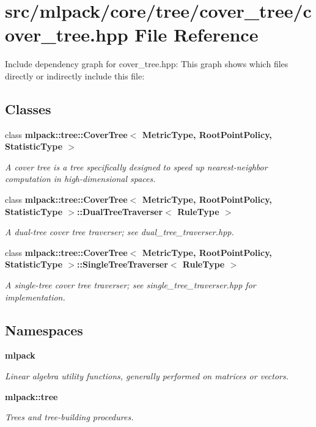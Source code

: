 \section{src/mlpack/core/tree/cover\-\_\-tree/cover\-\_\-tree.hpp File Reference}
\label{cover__tree_2cover__tree_8hpp}
Include dependency graph for cover\-\_\-tree.\-hpp\-:
This graph shows which files directly or indirectly include this file\-:
\subsection*{Classes}
\begin{DoxyCompactItemize}
\item 
class {\bf mlpack\-::tree\-::\-Cover\-Tree$<$ Metric\-Type, Root\-Point\-Policy, Statistic\-Type $>$}
\begin{DoxyCompactList}\small\item\em A cover tree is a tree specifically designed to speed up nearest-\/neighbor computation in high-\/dimensional spaces. \end{DoxyCompactList}\item 
class {\bf mlpack\-::tree\-::\-Cover\-Tree$<$ Metric\-Type, Root\-Point\-Policy, Statistic\-Type $>$\-::\-Dual\-Tree\-Traverser$<$ Rule\-Type $>$}
\begin{DoxyCompactList}\small\item\em A dual-\/tree cover tree traverser; see dual\-\_\-tree\-\_\-traverser.\-hpp. \end{DoxyCompactList}\item 
class {\bf mlpack\-::tree\-::\-Cover\-Tree$<$ Metric\-Type, Root\-Point\-Policy, Statistic\-Type $>$\-::\-Single\-Tree\-Traverser$<$ Rule\-Type $>$}
\begin{DoxyCompactList}\small\item\em A single-\/tree cover tree traverser; see single\-\_\-tree\-\_\-traverser.\-hpp for implementation. \end{DoxyCompactList}\end{DoxyCompactItemize}
\subsection*{Namespaces}
\begin{DoxyCompactItemize}
\item 
{\bf mlpack}
\begin{DoxyCompactList}\small\item\em Linear algebra utility functions, generally performed on matrices or vectors. \end{DoxyCompactList}\item 
{\bf mlpack\-::tree}
\begin{DoxyCompactList}\small\item\em Trees and tree-\/building procedures. \end{DoxyCompactList}\end{DoxyCompactItemize}
